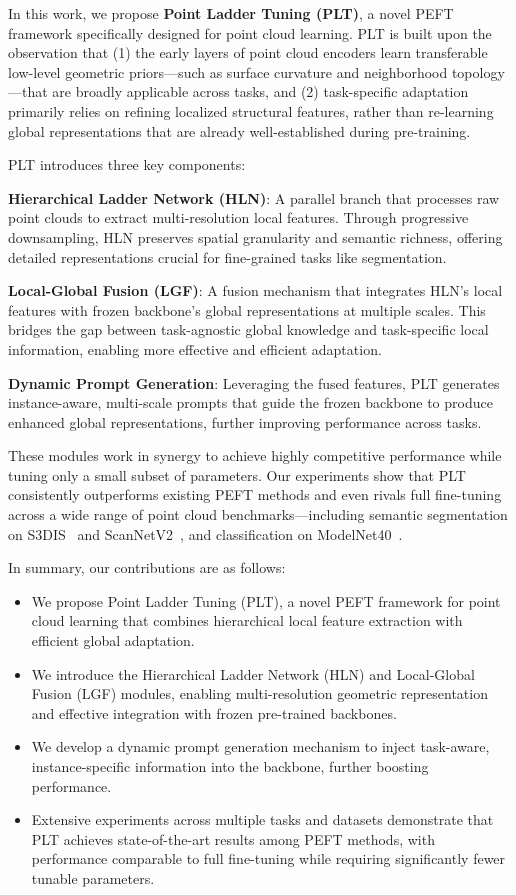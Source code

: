 In this work, we propose \textbf{Point Ladder Tuning (PLT)}, a novel PEFT framework specifically designed for point cloud learning. PLT is built upon the observation that (1) the early layers of point cloud encoders learn transferable low-level geometric priors—such as surface curvature and neighborhood topology—that are broadly applicable across tasks, and (2) task-specific adaptation primarily relies on refining localized structural features, rather than re-learning global representations that are already well-established during pre-training.

PLT introduces three key components:

\textbf{Hierarchical Ladder Network (HLN)}: A parallel branch that processes raw point clouds to extract multi-resolution local features. Through progressive downsampling, HLN preserves spatial granularity and semantic richness, offering detailed representations crucial for fine-grained tasks like segmentation.

\textbf{Local-Global Fusion (LGF)}: A fusion mechanism that integrates HLN's local features with frozen backbone's global representations at multiple scales. This bridges the gap between task-agnostic global knowledge and task-specific local information, enabling more effective and efficient adaptation.

\textbf{Dynamic Prompt Generation}: Leveraging the fused features, PLT generates instance-aware, multi-scale prompts that guide the frozen backbone to produce enhanced global representations, further improving performance across tasks.

These modules work in synergy to achieve highly competitive performance while tuning only a small subset of parameters. Our experiments show that PLT consistently outperforms existing PEFT methods and even rivals full fine-tuning across a wide range of point cloud benchmarks—including semantic segmentation on S3DIS~\cite{armeni20163d} and ScanNetV2~\cite{dai2017scannet}, and classification on ModelNet40~\cite{wu20153d}.

In summary, our contributions are as follows:
\begin{itemize}
\item We propose Point Ladder Tuning (PLT), a novel PEFT framework for point cloud learning that combines hierarchical local feature extraction with efficient global adaptation.
\item We introduce the Hierarchical Ladder Network (HLN) and Local-Global Fusion (LGF) modules, enabling multi-resolution geometric representation and effective integration with frozen pre-trained backbones.
\item We develop a dynamic prompt generation mechanism to inject task-aware, instance-specific information into the backbone, further boosting performance.
\item Extensive experiments across multiple tasks and datasets demonstrate that PLT achieves state-of-the-art results among PEFT methods, with performance comparable to full fine-tuning while requiring significantly fewer tunable parameters.
\end{itemize}

